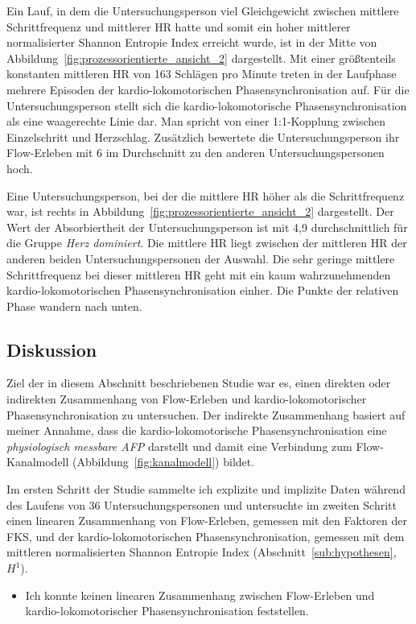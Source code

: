 Ein Lauf, in dem die Untersuchungsperson viel Gleichgewicht zwischen mittlere Schrittfrequenz und mittlerer \ac{HR} hatte und somit ein hoher mittlerer normalisierter Shannon Entropie Index erreicht wurde, ist in der Mitte von Abbildung~\ref{fig:prozessorientierte_ansicht_2} dargestellt. Mit einer größtenteils konstanten mittleren \ac{HR} von 163 Schlägen pro Minute treten in der Laufphase mehrere Episoden der kardio-lokomotorischen Phasensynchronisation auf. Für die Untersuchungsperson stellt sich die kardio-lokomotorische Phasensynchronisation als eine waagerechte Linie dar. Man spricht von einer 1:1-Kopplung zwischen Einzelschritt und Herzschlag. Zusätzlich bewertete die Untersuchungsperson ihr Flow-Erleben mit 6 im Durchschnitt zu den anderen Untersuchungspersonen hoch. 

Eine Untersuchungsperson, bei der die mittlere \ac{HR} höher als die Schrittfrequenz war, ist rechts in Abbildung~\ref{fig:prozessorientierte_ansicht_2} dargestellt. Der Wert der Absorbiertheit der Untersuchungsperson ist mit 4,9 durchschnittlich für die Gruppe \emph{Herz dominiert}. Die mittlere \ac{HR} liegt zwischen der mittleren \ac{HR} der anderen beiden Untersuchungspersonen der Auswahl. Die sehr geringe mittlere Schrittfrequenz bei dieser mittleren \ac{HR} geht mit ein kaum wahrzunehmenden kardio-lokomotorischen Phasensynchronisation einher. Die Punkte der relativen Phase wandern nach unten. 

\subsection{Diskussion} 

\label{sub:diskussion_5_3}

Ziel der in diesem Abschnitt beschriebenen Studie war es, einen direkten oder indirekten Zusammenhang von Flow-Erleben und kardio-lokomotorischer Phasensynchronisation zu untersuchen. Der indirekte Zusammenhang basiert auf meiner Annahme, dass die kardio-lokomotorische Phasensynchronisation eine \emph{physiologisch messbare \ac{AFP}} darstellt und damit eine Verbindung zum Flow-Kanalmodell (Abbildung~\ref{fig:kanalmodell}) bildet. 

Im ersten Schritt der Studie sammelte ich explizite und implizite Daten während des Laufens von 36 Untersuchungspersonen und untersuchte im zweiten Schritt einen linearen Zusammenhang von Flow-Erleben, gemessen mit den Faktoren der \ac{FKS}, und der kardio-lokomotorischen Phasensynchronisation, gemessen mit dem mittleren normalisierten Shannon Entropie Index (Abschnitt~\ref{sub:hypothesen}, $H^1$). 
\begin{itemize}
	
	\item Ich konnte keinen linearen Zusammenhang zwischen Flow-Erleben und kardio-lokomotorischer Phasensynchronisation feststellen.
\end{itemize}

